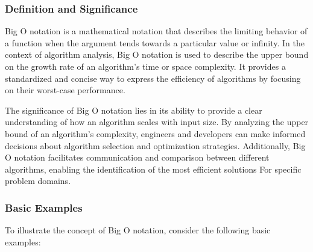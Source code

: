 \documentclass[12pt]{book} %
\begin{document}
\subsubsection{Definition and Significance}

Big O notation is a mathematical notation that describes the limiting behavior of a function when the argument tends towards a particular value or infinity. In the context of algorithm analysis, Big O notation is used to describe the upper bound on the growth rate of an algorithm's time or space complexity. It provides a standardized and concise way to express the efficiency of algorithms by focusing on their worst-case performance.

The significance of Big O notation lies in its ability to provide a clear understanding of how an algorithm scales with input size. By analyzing the upper bound of an algorithm's complexity, engineers and developers can make informed decisions about algorithm selection and optimization strategies. Additionally, Big O notation facilitates communication and comparison between different algorithms, enabling the identification of the most efficient solutions For specific problem domains.

\subsubsection{Basic Examples}

To illustrate the concept of Big O notation, consider the following basic examples:
\end{document}
